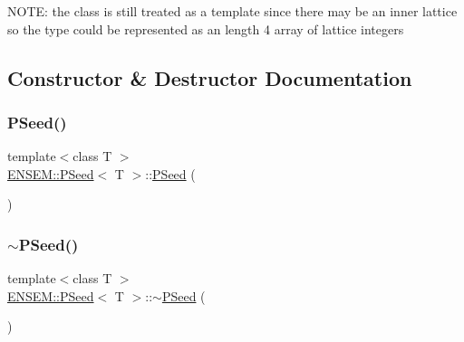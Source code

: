 N\+O\+TE\+: the class is still treated as a template since there may be an inner lattice so the type could be represented as an length 4 array of lattice integers 

\subsection{Constructor \& Destructor Documentation}
\mbox{\label{classENSEM_1_1PSeed_a23818769d84caba2047eaf425f2073f1}} 
\subsubsection{\texorpdfstring{PSeed()}{PSeed()}\hspace{0.1cm}{\footnotesize\ttfamily [1/6]}}
{\footnotesize\ttfamily template$<$class T $>$ \\
\mbox{\hyperlink{classENSEM_1_1PSeed}{E\+N\+S\+E\+M\+::\+P\+Seed}}$<$ T $>$\+::\mbox{\hyperlink{classENSEM_1_1PSeed}{P\+Seed}} (\begin{DoxyParamCaption}{ }\end{DoxyParamCaption})\hspace{0.3cm}{\ttfamily [inline]}}

\mbox{\label{classENSEM_1_1PSeed_a6796252e24ea4c2ec43bf2600f2ffdc7}} 
\subsubsection{\texorpdfstring{$\sim$PSeed()}{~PSeed()}\hspace{0.1cm}{\footnotesize\ttfamily [1/2]}}
{\footnotesize\ttfamily template$<$class T $>$ \\
\mbox{\hyperlink{classENSEM_1_1PSeed}{E\+N\+S\+E\+M\+::\+P\+Seed}}$<$ T $>$\+::$\sim$\mbox{\hyperlink{classENSEM_1_1PSeed}{P\+Seed}} (\begin{DoxyParamCaption}{ }\end{DoxyParamCaption})\hspace{0.3cm}{\ttfamily [inline]}}

\mbox{\label{classENSEM_1_1PSeed_a0c2df1585f47479069319dd97de9c4ea}} 
